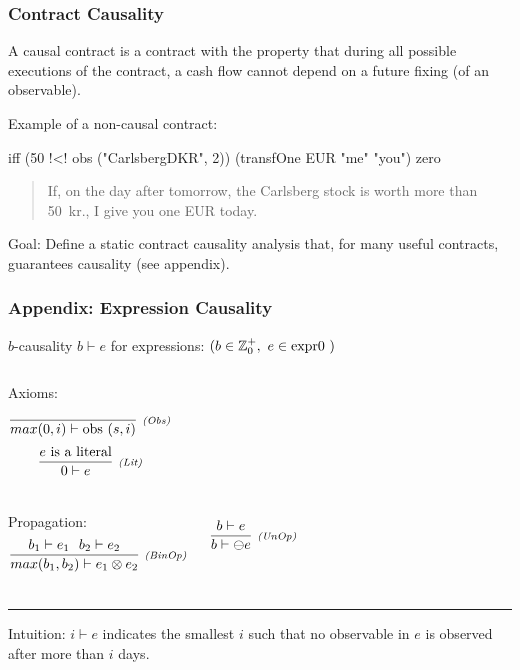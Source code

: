 \documentclass[xcolor=dvipsnames,11pt]{beamer}
\newcommand{\comment}[2]{{\tiny \color{Orange}{$\spadesuit${\bf #1: }{\sf #2}$\spadesuit$}}}
\newcommand{\jbcomment}[1]{\comment{JB}{#1}}
\renewcommand{\emph}[1]{\textcolor{structure!90}{#1}}
\newcommand{\ttt}[1]{\mbox{\cd{#1}~}}
\begin{document}
\begin{frame}[fragile,t]
    \frametitle{Contract Causality}

 A \emph{causal contract} is a contract with the property that during all
   possible executions of the contract, a cash flow cannot depend on a
   future fixing (of an observable).

\vfill

\emph{Example of a non-causal contract:}

\begin{hscode}
iff (50 !<! obs ("CarlsbergDKR", 2)) 
    (transfOne EUR "me" "you") zero
\end{hscode}
{\footnotesize
\begin{quote}
  If, \emph{on the day after tomorrow}, 
           the Carlsberg stock is worth more than 50~kr.,
           I give you one EUR \emph{today}.
\end{quote}}

\vfill

\emph{Goal}: Define a static contract causality analysis that, for many useful contracts,
guarantees causality (see appendix).
\end{frame}

\begin{frame}
    \frametitle{Appendix: Expression Causality}

\emph{$b$-causality} $ b \vdash e$ for \emph{expressions}:
{\scriptsize $ (b \in \mathbb{Z}_0^+, \ e \in \ttt{expr0})$}

\begin{columns}
\emph{Axioms:}
$$\crule{(Obs)}{}{max(0,i) \vdash \ttt{obs}(s,i)}$$
$$\crule{(Lit)}{e \mbox{ is a literal}}{0 \vdash e}$$
\end{columns}


\begin{columns}
\emph{Propagation:}
$$\crule{(BinOp)}{b_1 \vdash e_1\ \ b_2 \vdash e_2 }{max(b_1,b_2) \vdash e_1 \otimes e_2}$$

$$\crule{(UnOp)}{b \vdash e}{b \vdash \ominus e}$$
\end{columns}

\medskip
\hrule
\medskip

\emph{Intuition:} $i \vdash e$ indicates the smallest $i$ such that no observable in $e$ is observed \emph{after more than $i$ days}.

\end{frame}
\end{document}

